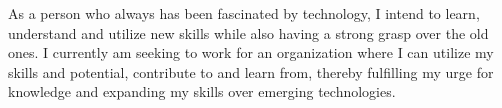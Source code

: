 

\begin{cvparagraph}

As a person who always has been fascinated by technology, I intend to learn, understand and utilize new skills while also having a strong grasp over the old ones. I currently am seeking to work for an organization where I can utilize my skills and potential, contribute to and learn from, thereby fulfilling my urge for knowledge and expanding my skills over emerging technologies.
\end{cvparagraph}
